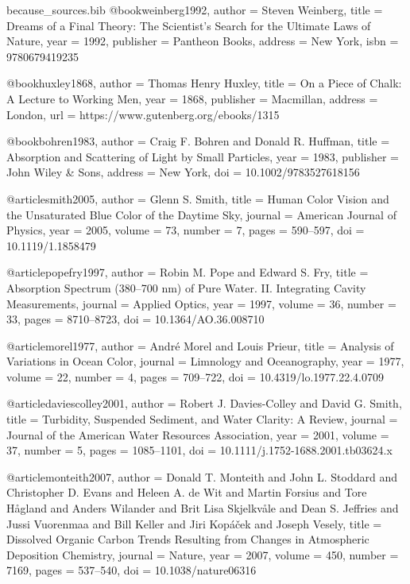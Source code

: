 \begin{filecontents*}{because_sources.bib}
@book{weinberg1992,
  author    = {Steven Weinberg},
  title     = {Dreams of a Final Theory: The Scientist's Search for the Ultimate Laws of Nature},
  year      = {1992},
  publisher = {Pantheon Books},
  address   = {New York},
  isbn      = {9780679419235}
}

@book{huxley1868,
  author    = {Thomas Henry Huxley},
  title     = {On a Piece of Chalk: A Lecture to Working Men},
  year      = {1868},
  publisher = {Macmillan},
  address   = {London},
  url       = {https://www.gutenberg.org/ebooks/1315}
}

@book{bohren1983,
  author    = {Craig F. Bohren and Donald R. Huffman},
  title     = {Absorption and Scattering of Light by Small Particles},
  year      = {1983},
  publisher = {John Wiley \& Sons},
  address   = {New York},
  doi       = {10.1002/9783527618156}
}

@article{smith2005,
  author  = {Glenn S. Smith},
  title   = {Human Color Vision and the Unsaturated Blue Color of the Daytime Sky},
  journal = {American Journal of Physics},
  year    = {2005},
  volume  = {73},
  number  = {7},
  pages   = {590--597},
  doi     = {10.1119/1.1858479}
}

@article{popefry1997,
  author  = {Robin M. Pope and Edward S. Fry},
  title   = {Absorption Spectrum (380--700 nm) of Pure Water. {II}. Integrating Cavity Measurements},
  journal = {Applied Optics},
  year    = {1997},
  volume  = {36},
  number  = {33},
  pages   = {8710--8723},
  doi     = {10.1364/AO.36.008710}
}

@article{morel1977,
  author  = {Andr\'e Morel and Louis Prieur},
  title   = {Analysis of Variations in Ocean Color},
  journal = {Limnology and Oceanography},
  year    = {1977},
  volume  = {22},
  number  = {4},
  pages   = {709--722},
  doi     = {10.4319/lo.1977.22.4.0709}
}

@article{daviescolley2001,
  author  = {Robert J. Davies-Colley and David G. Smith},
  title   = {Turbidity, Suspended Sediment, and Water Clarity: A Review},
  journal = {Journal of the American Water Resources Association},
  year    = {2001},
  volume  = {37},
  number  = {5},
  pages   = {1085--1101},
  doi     = {10.1111/j.1752-1688.2001.tb03624.x}
}

@article{monteith2007,
  author  = {Donald T. Monteith and John L. Stoddard and Christopher D. Evans and Heleen A. de Wit and Martin Forsius and Tore H\aa gland and Anders Wilander and Brit Lisa Skjelkv\aa le and Dean S. Jeffries and Jussi Vuorenmaa and Bill Keller and Jiri Kop\'a\v{c}ek and Joseph Vesely},
  title   = {Dissolved Organic Carbon Trends Resulting from Changes in Atmospheric Deposition Chemistry},
  journal = {Nature},
  year    = {2007},
  volume  = {450},
  number  = {7169},
  pages   = {537--540},
  doi     = {10.1038/nature06316}
}


\end{filecontents*}
